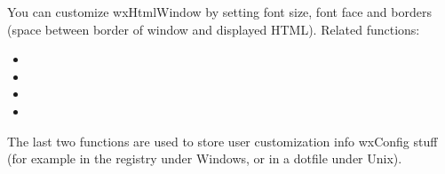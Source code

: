
You can customize wxHtmlWindow by setting font size, font face and
borders (space between border of window and displayed HTML). Related functions:

\begin{itemize}\itemsep=0pt
\item {}
\item {}
\item {}
\item {}
\end{itemize}

The last two functions are used to store user customization info wxConfig stuff
(for example in the registry under Windows, or in a dotfile under Unix).

